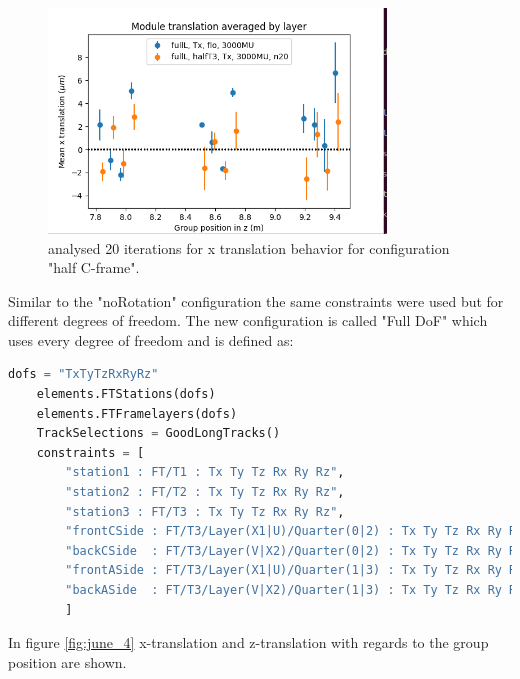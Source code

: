 \begin{figure}
  \centering
  \includegraphics[width=0.8\textwidth]{plots/june_21/allT_halfT3_n20_Tx.png}
  \caption{analysed 20 iterations for x translation behavior for configuration "half C-frame".}
  \label{fig:june_3}
\end{figure}

Similar to the "noRotation" configuration the same constraints were used but for different degrees of freedom. The new configuration is called "Full DoF" which uses every degree of freedom and is defined as:

\begin{lstlisting}[language=Python]
    dofs = "TxTyTzRxRyRz"
    elements.FTStations(dofs)
    elements.FTFramelayers(dofs)
    TrackSelections = GoodLongTracks()
    constraints = [
        "station1 : FT/T1 : Tx Ty Tz Rx Ry Rz",
        "station2 : FT/T2 : Tx Ty Tz Rx Ry Rz",
        "station3 : FT/T3 : Tx Ty Tz Rx Ry Rz",
        "frontCSide : FT/T3/Layer(X1|U)/Quarter(0|2) : Tx Ty Tz Rx Ry Rz",
        "backCSide  : FT/T3/Layer(V|X2)/Quarter(0|2) : Tx Ty Tz Rx Ry Rz",
        "frontASide : FT/T3/Layer(X1|U)/Quarter(1|3) : Tx Ty Tz Rx Ry Rz",
        "backASide  : FT/T3/Layer(V|X2)/Quarter(1|3) : Tx Ty Tz Rx Ry Rz"
        ]
\end{lstlisting}

In figure \ref{fig:june_4} x-translation and z-translation with regards to
the group position are shown.

